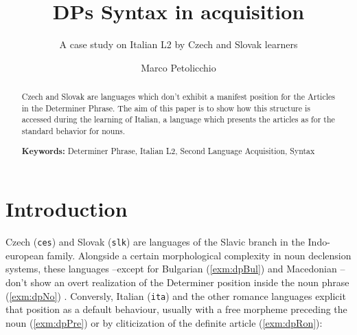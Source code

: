 \documentclass[a4paper,twoside,12pt,chapterprefix=false,listof=flat]{scrartcl}
\title{DPs Syntax in acquisition}
\subtitle{A case study on Italian L2 by Czech and Slovak learners}
\author{Marco Petolicchio}
\date{}
\theoremstyle{plain} %
\theoremstyle{definition}
\theoremstyle{remark}
\begin{document}
\maketitle
\begin{abstract}
Czech and Slovak are languages which don't exhibit a manifest position
for the Articles in the Determiner Phrase. The aim of this paper is to
show how this structure is accessed during the learning of Italian, a
language which presents the articles as for the standard behavior for
nouns.

\par

\textbf{Keywords:} Determiner Phrase, Italian L2, Second Language
Acquisition, Syntax
\end{abstract}

{
\setcounter{tocdepth}{2}
\tableofcontents
}
\clearpage

\hypertarget{introduction}{%
\section{Introduction}\label{introduction}}

Czech (\texttt{ces}) and Slovak (\texttt{slk}) are languages of the
Slavic branch in the Indo-european family. Alongside a certain
morphological complexity in noun declension systems, these languages
--except for Bulgarian (\ref{exm:dpBul}) and Macedonian
\citep{wals-37}-- don't show an overt realization of the Determiner
position inside the noun phrase (\ref{exm:dpNo}) \citep{harkins1953}.
Conversly, Italian (\texttt{ita}) and the other romance languages
explicit that position as a default behaviour, usually with a free
morpheme preceding the noun (\ref{exm:dpPre}) or by cliticization of the
definite article (\ref{exm:dpRon}):
\end{document}
